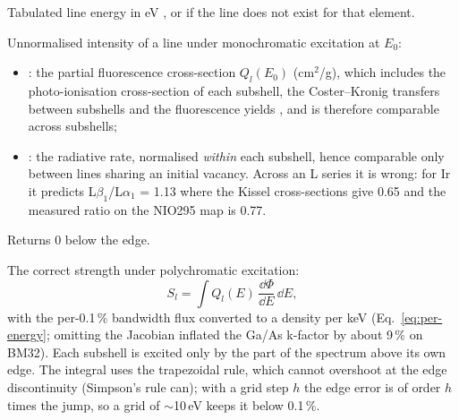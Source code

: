 Tabulated line energy in eV \citep{Elam2002,Schoonjans2011}, or  if the line does
not exist for that element.

Unnormalised intensity of a line under monochromatic excitation at $E_0$:
\begin{itemize}[nosep]
\item {}: the partial fluorescence cross-section $Q_l(E_0)$ (cm$^2$/g), which
  includes the photo-ionisation cross-section of each subshell, the Coster--Kronig transfers
  between subshells and the fluorescence yields \citep{Krause1979,Campbell2003}, and is
  therefore comparable across subshells;
\item {}: the radiative rate, normalised \emph{within} each subshell, hence
  comparable only between lines sharing an initial vacancy. Across an L series it is wrong:
  for Ir it predicts L$\beta_1$/L$\alpha_1$ = 1.13 where the Kissel cross-sections give 0.65
  and the measured ratio on the NIO295 map is 0.77.
\end{itemize}
Returns 0 below the edge.

The correct strength under polychromatic excitation:
\begin{equation}
  S_l = \int Q_l(E)\,\frac{\dd\Phi}{\dd E}\,\dd E ,
  \label{eq:flux-weighted}
\end{equation}
with the per-0.1\,\% bandwidth flux converted to a density per keV
(Eq.~\eqref{eq:per-energy}; omitting the Jacobian inflated the Ga/As k-factor by about 9\,\%
on BM32). Each subshell is excited only by the part of the spectrum above its own edge. The
integral uses the trapezoidal rule, which cannot overshoot at the edge discontinuity
(Simpson's rule can); with a grid step $h$ the edge error is of order $h$ times the jump, so a
grid of $\sim$10\,eV keeps it below 0.1\,\%.

